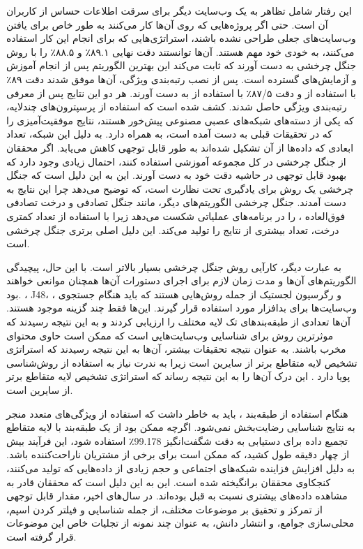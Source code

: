 \documentclass{CSICC2020}
\begin{document}
	این رفتار شامل تظاهر به یک وب‌سایت دیگر برای سرقت اطلاعات حساس از کاربران آن است. حتی اگر پروژه‌هایی که روی آن‌ها کار می‌کنند به طور خاص برای یافتن وب‌سایت‌های جعلی طراحی نشده باشند، استراتژی‌هایی که برای انجام این کار استفاده می‌کنند، به خودی خود مهم هستند. آن‌ها توانستند دقت نهایی ۸۹.۱٪ و ۸۸.۵٪ را با روش جنگل چرخشی به دست آورند که ثابت می‌کند این بهترین الگوریتم پس از انجام آموزش و آزمایش‌های گسترده است. پس از نصب رتبه‌بندی ویژگی، آن‌ها موفق شدند دقت ۸۹٪ با استفاده از  و دقت ۸۷/۵٪ با استفاده از  به دست آورند. هر دو این نتایج پس از معرفی رتبه‌بندی ویژگی حاصل شدند. کشف شده است که استفاده از پرسپترون‌های چندلایه، که یکی از دسته‌های شبکه‌های عصبی مصنوعی پیش‌خور هستند، نتایج موفقیت‌آمیزی را که در تحقیقات قبلی به دست آمده است، به همراه دارد. به دلیل این شبکه، تعداد ابعادی که داده‌ها از آن تشکیل شده‌اند به طور قابل توجهی کاهش می‌یابد. اگر محققان از جنگل چرخشی در کل مجموعه آموزشی استفاده کنند، احتمال زیادی وجود دارد که بهبود قابل توجهی در حاشیه دقت خود به دست آورند. این به این دلیل است که جنگل چرخشی یک روش برای یادگیری تحت نظارت است، که توضیح می‌دهد چرا این نتایج به دست آمدند. جنگل چرخشی الگوریتم‌های دیگر، مانند جنگل تصادفی و درخت تصادفی فوق‌العاده \cite{sharma2020malicious}، را در برنامه‌های عملیاتی شکست می‌دهد زیرا با استفاده از تعداد کمتری درخت، تعداد بیشتری از نتایج را تولید می‌کند. این دلیل اصلی برتری جنگل چرخشی است.
	
	
	به عبارت دیگر، کارآیی روش جنگل چرخشی بسیار بالاتر است. با این حال، پیچیدگی الگوریتم‌های آن‌ها و مدت زمان لازم برای اجرای دستورات آن‌ها همچنان موانعی خواهند بود. ، J48، ، و رگرسیون لجستیک از جمله روش‌هایی هستند که باید هنگام جستجوی وب‌سایت‌ها برای بدافزار مورد استفاده قرار گیرند. این‌ها فقط چند گزینه موجود هستند. آن‌ها تعدادی از طبقه‌بندهای تک لایه مختلف را ارزیابی کردند و به این نتیجه رسیدند که  موثرترین روش برای شناسایی وب‌سایت‌هایی است که ممکن است حاوی محتوای مخرب باشند. به عنوان نتیجه تحقیقات بیشتر، آن‌ها به این نتیجه رسیدند که استراتژی تشخیص لایه متقاطع  برتر از سایرین است زیرا به ندرت نیاز به استفاده از روش‌شناسی پویا دارد \cite{wang2020auto2}. این درک آن‌ها را به این نتیجه رساند که استراتژی تشخیص لایه متقاطع  برتر از سایرین است.
	
	هنگام استفاده از طبقه‌بند ، باید به خاطر داشت که استفاده از ویژگی‌های متعدد منجر به نتایج شناسایی رضایت‌بخش نمی‌شود. اگرچه ممکن بود از یک طبقه‌بند  با لایه متقاطع تجمیع داده برای دستیابی به دقت شگفت‌انگیز 99.178٪ استفاده شود، این فرآیند بیش از چهار دقیقه طول کشید، که ممکن است برای برخی از مشتریان ناراحت‌کننده باشد. به دلیل افزایش فزاینده شبکه‌های اجتماعی و حجم زیادی از داده‌هایی که تولید می‌کنند، کنجکاوی محققان برانگیخته شده است. این به این دلیل است که محققان قادر به مشاهده داده‌های بیشتری نسبت به قبل بوده‌اند. در سال‌های اخیر، مقدار قابل توجهی از تمرکز و تحقیق بر موضوعات مختلف، از جمله شناسایی و فیلتر کردن اسپم، محلی‌سازی جوامع، و انتشار دانش، به عنوان چند نمونه از تجلیات خاص این موضوعات قرار گرفته است.
	
\end{document}
